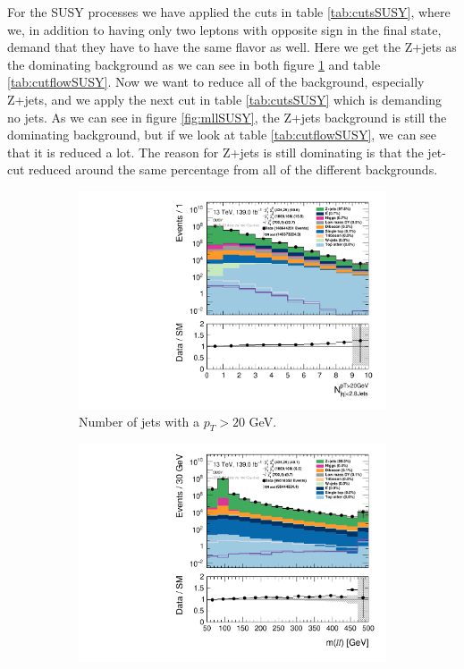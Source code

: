 For the SUSY processes we have applied the cuts in table \ref{tab:cutsSUSY}, where we, in addition to having only two leptons with opposite sign in the final state, demand that they have to have the same flavor as well. Here we get the Z+jets as the dominating background as we can see in both figure \ref{fig:nJetSUSY} and table \ref{tab:cutflowSUSY}. Now we want to reduce all of the background, especially Z+jets, and we apply the next cut in table \ref{tab:cutsSUSY} which is demanding no jets. As we can see in figure \ref{fig:mllSUSY}, the Z+jets background is still the dominating background, but if we look at table \ref{tab:cutflowSUSY}, we can see that it is reduced a lot. The reason for Z+jets is still dominating is that the jet-cut reduced around the same percentage from all of the different backgrounds. 

\begin{figure}[H]
\centering
    \begin{subfigure}[t!]{0.49\textwidth}
        \includegraphics[width=\textwidth]{Figures/SUSYcuts/hist1d_nJet20_SUSY.pdf}
    \caption{Number of jets with a $p_T > 20$ GeV.}
    \label{fig:nJetSUSY}
    \end{subfigure}
    \begin{subfigure}[t!]{0.49\textwidth}
        \includegraphics[width=\textwidth]{Figures/SUSYcuts/hist1d_mll_SUSY.pdf}

\end{subfigure}
\end{figure}
